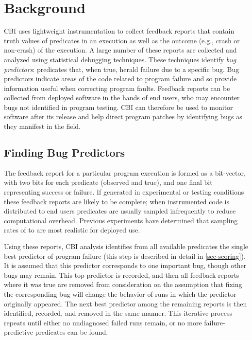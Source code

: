 
\section{Background}
\label{sec-background}
CBI uses lightweight instrumentation to collect feedback reports that contain truth values of predicates in an execution as well as the outcome (e.g., crash or non-crash) of the execution.  A large number of these reports are collected and analyzed using statistical debugging techniques.  These techniques identify \emph{bug predictors}: predicates that, when true, herald failure due to a specific bug.  Bug predictors indicate areas of the code related to program failure and so provide information useful when correcting program faults.  Feedback reports can be collected from deployed software in the hands of end users, who may encounter bugs not identified in program testing.  CBI can therefore be used to monitor software after its release and help direct program patches by identifying bugs as they manifest in the field.

\subsection{Finding Bug Predictors}
\label{sec-elimalg}
The feedback report for a particular program execution is formed as a bit-vector, with two bits for each predicate (observed and true), and one final bit representing success or failure.  If generated in experimental or testing conditions these feedback reports are likely to be complete; when instrumented code is distributed to end users predicates are usually sampled infrequently to reduce computational overhead.  Previous experiments \cite{Liblit:2003:BIRPS} have determined that sampling rates of  to  are most realistic for deployed use.

Using these reports, CBI analysis identifies from all available predicates the single best predictor of program failure (this step is described in detail in \autoref{sec-scoring}).  It is assumed that this predictor corresponds to one important bug, though other bugs may remain.    This top predictor is recorded, and then all feedback reports where it was true are removed from consideration on the assumption that fixing the corresponding bug will change the behavior of runs in which the predictor originally appeared.  The next best predictor among the remaining reports is then identified, recorded, and removed in the same manner.  This iterative process repeats until either no undiagnosed failed runs remain, or no more failure-predictive predicates can be found.

